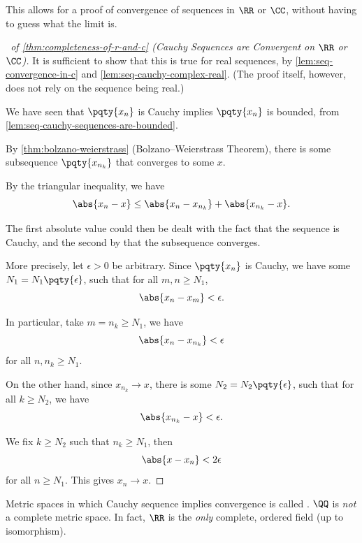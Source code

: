 \begin{remark}
    This allows for a proof of convergence of sequences in \(\RR\) or \(\CC\), without having to guess what the limit is.
\end{remark}

\begin{proof}[\proofname\ of \autoref{thm:completeness-of-r-and-c} (Cauchy Sequences are Convergent on \(\RR\) or \(\CC\))]
    It is sufficient to show that this is true for real sequences, by \autoref{lem:seq-convergence-in-c} and \autoref{lem:seq-cauchy-complex-real}. (The proof itself, however, does not rely on the sequence being real.)

    We have seen that \(\pqty{x_n}\) is Cauchy implies \(\pqty{x_n}\) is bounded, from \autoref{lem:seq-cauchy-sequences-are-bounded}.
    
    By \autoref{thm:bolzano-weierstrass} (Bolzano--Weierstrass Theorem), there is some subsequence \(\pqty{x_{n_k}}\) that converges to some \(x\).

    By the triangular inequality, we have
    \[
        \abs{x_n - x} \leq \abs{x_n - x_{n_k}} + \abs{x_{n_k} - x}.
    \]

    The first absolute value could then be dealt with the fact that the sequence is Cauchy, and the second by that the subsequence converges.

    More precisely, let \(\epsilon > 0\) be arbitrary. Since \(\pqty{x_n}\) is Cauchy, we have some \(N_1 = N_1 \pqty{\epsilon}\), such that for all \(m, n \geq N_1\),
    \[
        \abs{x_n - x_m} < \epsilon.
    \]

    In particular, take \(m = n_k \geq N_1\), we have
    \[
        \abs{x_n - x_{n_k}} < \epsilon
    \]
    for all \(n, n_k \geq N_1\).

    On the other hand, since \(x_{n_k} \to x\), there is some \(N_2 = N_2 \pqty{\epsilon}\), such that for all \(k \geq N_2\), we have
    \[
        \abs{x_{n_k} - x} < \epsilon.
    \]

    We fix \(k \geq N_2\) such that \(n_k \geq N_1\), then
    \[
        \abs{x - x_n} < 2\epsilon
    \]
    for all \(n \geq N_1\). This gives \(x_n \to x\).
\end{proof}

\begin{remark}
    Metric spaces in which Cauchy sequence implies convergence is called . \(\QQ\) is \emph{not} a complete metric space. In fact, \(\RR\) is the \emph{only} complete, ordered field (up to isomorphism).
\end{remark}

